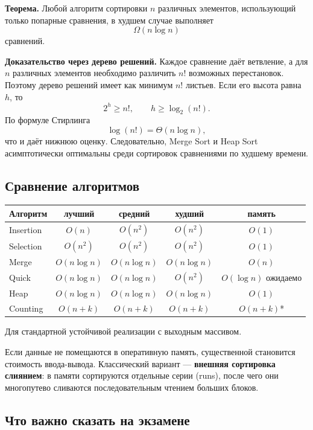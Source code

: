 \textbf{Теорема.} Любой алгоритм сортировки $n$ различных элементов, использующий только попарные сравнения, в худшем случае выполняет
\[
\Omega(n\log n)
\]
сравнений.

\textbf{Доказательство через дерево решений.} Каждое сравнение даёт ветвление, а для $n$ различных элементов необходимо различить $n!$ возможных перестановок. Поэтому дерево решений имеет как минимум $n!$ листьев. Если его высота равна $h$, то
\[
2^h\ge n!,
\qquad
h\ge\log_2(n!).
\]
По формуле Стирлинга
\[
\log(n!)=\Theta(n\log n),
\]
что и даёт нижнюю оценку. Следовательно, Merge Sort и Heap Sort асимптотически оптимальны среди сортировок сравнениями по худшему времени.

\subsection{Сравнение алгоритмов}

\begin{center}
\begin{tabular}{|l|c|c|c|c|}
\hline
\textbf{Алгоритм} & \textbf{лучший} & \textbf{средний} & \textbf{худший} & \textbf{память} \\
\hline
Insertion & $O(n)$ & $O(n^2)$ & $O(n^2)$ & $O(1)$ \\
Selection & $O(n^2)$ & $O(n^2)$ & $O(n^2)$ & $O(1)$ \\
Merge & $O(n\log n)$ & $O(n\log n)$ & $O(n\log n)$ & $O(n)$ \\
Quick & $O(n\log n)$ & $O(n\log n)$ & $O(n^2)$ & $O(\log n)$ ожидаемо \\
Heap & $O(n\log n)$ & $O(n\log n)$ & $O(n\log n)$ & $O(1)$ \\
Counting & $O(n+k)$ & $O(n+k)$ & $O(n+k)$ & $O(n+k)$* \\
\hline
\end{tabular}
\end{center}

\noindent *Для стандартной устойчивой реализации с выходным массивом.

Если данные не помещаются в оперативную память, существенной становится стоимость ввода-вывода. Классический вариант --- \textbf{внешняя сортировка слиянием}: в памяти сортируются отдельные серии (runs), после чего они многопутево сливаются последовательным чтением больших блоков.

\subsection{Что важно сказать на экзамене}

